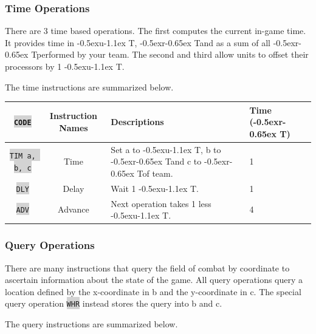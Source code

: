 \documentclass{article}
\newcommand{\vnscode}[1]{\colorbox{lightgray}{\lstinline[language=vns]{#1}}}
\newcommand{\UT}{\lower-0.5ex\hbox{u}\kern-1.1ex T}
\newcommand{\RT}{\lower-0.5ex\hbox{r}\kern-0.65ex T}
\begin{document}
\subsubsection{Time Operations}

There are 3 time based operations. The first computes the current in-game time.
It provides time in \UT, \RT and as a sum of all \RT performed by your team. The
second and third allow units to offset their processors by 1 \UT.

The time instructions are summarized below.

\begin{minipage}{\textwidth}
\label{table:time}
\centering
\begin{tabular}{|c|c|l|l|}
    \hline \vnscode{CODE} & Instruction Names & Descriptions & Time (\RT) \\ \hline
    \vnscode{TIM a, b, c} & Time & Set a to \UT, b to \RT and c to \RT of team.  & 1 \\ \hline
    \vnscode{DLY} & Delay & Wait 1 \UT. & 1 \\ \hline
    \vnscode{ADV} & Advance & Next operation takes 1 less \UT. & 4 \\ \hline
\end{tabular}
\end{minipage}

\subsubsection{Query Operations}

There are many instructions that query the field of combat by coordinate to
ascertain information about the state of the game. All query operations
query a location defined by the x-coordinate in b and the y-coordinate in c.
The special query operation \vnscode{WHR} instead stores the query into b and c.

The query instructions are summarized below.
\end{document}
